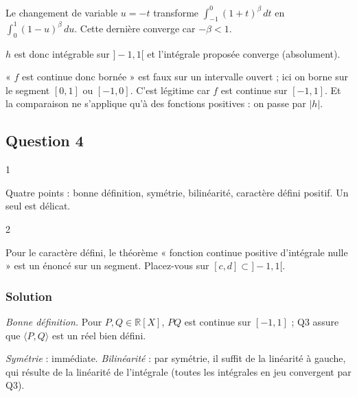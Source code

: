 \documentclass[11pt,a4paper]{article}
\newcommand{\equationajustee}[1]{%
  \sbox{\boiteequation}{$\displaystyle #1$}%
  \ifdim\wd\boiteequation>\linewidth
    \[\resizebox{\linewidth}{!}{\usebox{\boiteequation}}\]%
  \else
    \[#1\]%
  \fi}
\begin{document}
\equationajustee{|h(t)|\leqslant M_2(1+t)^\beta.}

Le changement de variable \(u=-t\) transforme \(\int_{-1}^0(1+t)^\beta\,dt\) en \(\int_0^1(1-u)^\beta\,du\). Cette dernière converge car \(-\beta<1\).

\(h\) est donc intégrable sur \(]-1,1[\) et l'intégrale proposée converge (absolument).

\begin{piege}

« \(f\) est continue donc bornée » est faux sur un intervalle ouvert ; ici on borne sur le segment \([0,1]\) ou \([-1,0]\). C'est légitime car \(f\) est continue sur \([-1,1]\). Et la comparaison ne s'applique qu'à des fonctions positives : on passe par \(|h|\).

\end{piege}

\hypertarget{question-4}{%
\subsection{Question 4}\label{question-4}}

\begin{indication}{1}

Quatre points : bonne définition, symétrie, bilinéarité, caractère défini positif. Un seul est délicat.

\end{indication}

\begin{indication}{2}

Pour le caractère défini, le théorème « fonction continue positive d'intégrale nulle » est un énoncé sur un segment. Placez-vous sur \([c,d]\subset]-1,1[\).

\end{indication}

\hypertarget{solution-3}{%
\subsubsection{Solution}\label{solution-3}}

\emph{Bonne définition.} Pour \(P,Q\in\mathbb R[X]\), \(PQ\) est continue sur \([-1,1]\) ; Q3 assure que \(\langle P,Q\rangle\) est un réel bien défini.

\emph{Symétrie} : immédiate. \emph{Bilinéarité} : par symétrie, il suffit de la linéarité à gauche, qui résulte de la linéarité de l'intégrale (toutes les intégrales en jeu convergent par Q3).
\end{document}
